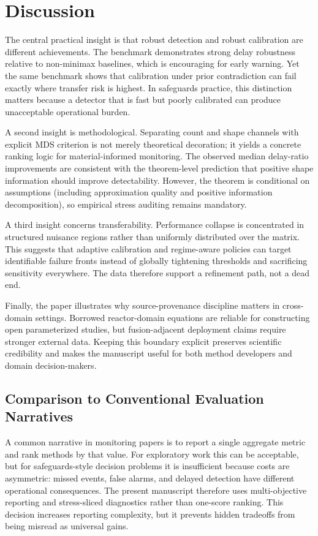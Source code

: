 \section{Discussion}\label{sec:discussion}
The central practical insight is that robust detection and robust calibration are different achievements. The benchmark demonstrates strong delay robustness relative to non-minimax baselines, which is encouraging for early warning. Yet the same benchmark shows that calibration under prior contradiction can fail exactly where transfer risk is highest. In safeguards practice, this distinction matters because a detector that is fast but poorly calibrated can produce unacceptable operational burden.

A second insight is methodological. Separating count and shape channels with explicit MDS criterion is not merely theoretical decoration; it yields a concrete ranking logic for material-informed monitoring. The observed median delay-ratio improvements are consistent with the theorem-level prediction that positive shape information should improve detectability. However, the theorem is conditional on assumptions (including approximation quality and positive information decomposition), so empirical stress auditing remains mandatory.

A third insight concerns transferability. Performance collapse is concentrated in structured nuisance regions rather than uniformly distributed over the matrix. This suggests that adaptive calibration and regime-aware policies can target identifiable failure fronts instead of globally tightening thresholds and sacrificing sensitivity everywhere. The data therefore support a refinement path, not a dead end.

Finally, the paper illustrates why source-provenance discipline matters in cross-domain settings. Borrowed reactor-domain equations are reliable for constructing open parameterized studies, but fusion-adjacent deployment claims require stronger external data. Keeping this boundary explicit preserves scientific credibility and makes the manuscript useful for both method developers and domain decision-makers.

\subsection{Comparison to Conventional Evaluation Narratives}
A common narrative in monitoring papers is to report a single aggregate metric and rank methods by that value. For exploratory work this can be acceptable, but for safeguards-style decision problems it is insufficient because costs are asymmetric: missed events, false alarms, and delayed detection have different operational consequences. The present manuscript therefore uses multi-objective reporting and stress-sliced diagnostics rather than one-score ranking. This decision increases reporting complexity, but it prevents hidden tradeoffs from being misread as universal gains.

